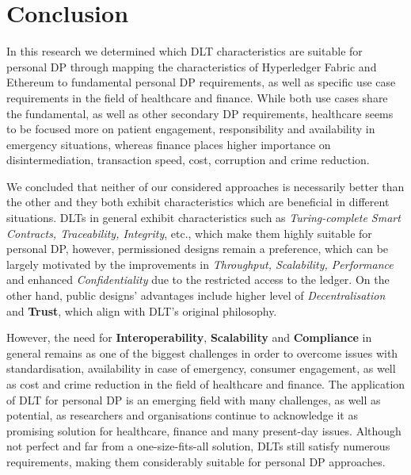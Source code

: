 
\chapter{Conclusion}
\label{ch:Conclusion}

In this research we determined which DLT characteristics are suitable for personal DP through mapping the characteristics of Hyperledger Fabric and Ethereum to fundamental personal DP requirements, as well as specific use case requirements in the field of healthcare and finance. While both use cases share the fundamental, as well as other secondary DP requirements, healthcare seems to be focused more on patient engagement, responsibility and availability in emergency situations, whereas finance places higher importance on disintermediation, transaction speed, cost, corruption and crime reduction.

We concluded that neither of our considered approaches is necessarily better than the other and they both exhibit characteristics which are beneficial in different situations. DLTs in general exhibit characteristics such as \textit{Turing-complete Smart Contracts, Traceability, Integrity}, etc., which make them highly suitable for personal DP, however, permissioned designs remain a preference, which can be largely motivated by the improvements in \textit{Throughput, Scalability, Performance} and enhanced \textit{Confidentiality} due to the restricted access to the ledger. On the other hand, public designs' advantages include higher level of \textit{Decentralisation} and \textbf{Trust}, which align with DLT's original philosophy.

However, the need for \textbf{Interoperability}, \textbf{Scalability} and \textbf{Compliance} in general remains as one of the biggest challenges in order to overcome issues with standardisation, availability in case of emergency, consumer engagement, as well as cost and crime reduction in the field of healthcare and finance. The application of DLT for personal DP is an emerging field with many challenges, as well as potential, as researchers and organisations continue to acknowledge it as promising solution for healthcare, finance and many present-day issues. Although not perfect and far from a one-size-fits-all solution, DLTs still satisfy numerous requirements, making them considerably suitable for personal DP approaches.
